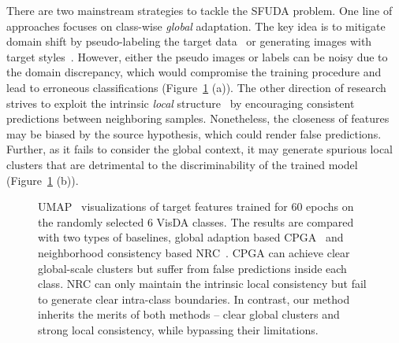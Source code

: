 \documentclass{article}
\begin{document}
There are two mainstream strategies to tackle the SFUDA problem. 
One line of approaches focuses on class-wise \textit{global} adaptation.
The key idea is to mitigate domain shift by pseudo-labeling the target data~\cite{shot, Qiu2021ijcai} or generating images with target styles~\cite{li2020model}.
However, either the pseudo images or labels can be noisy due to the domain discrepancy, which would compromise the training procedure and lead to erroneous classifications (Figure~\ref{fig:teaser} (a)).
The other direction of research strives to exploit the intrinsic \textit{local} structure~\cite{nrc_nips_2021,gsfda_iccv_2021} by encouraging consistent predictions between neighboring samples.
Nonetheless, the closeness of features may be biased by the source hypothesis, which could render false predictions.
Further, as it fails to consider the global context, it may generate spurious local clusters that are detrimental to the discriminability of the trained model (Figure~\ref{fig:teaser} (b)).




\begin{figure}[!htbp]
\centering
{}
\centering
\caption{UMAP~\cite{mcinnes2018umap-software} visualizations of target features trained for 60 epochs on the randomly selected 6 VisDA classes. The results are compared with two types of baselines, global adaption based CPGA~\cite{Qiu2021ijcai} and neighborhood consistency based NRC~\cite{nrc_nips_2021}.
CPGA can achieve clear global-scale clusters but suffer from false predictions inside each class. NRC can only maintain the intrinsic local consistency but fail to generate clear intra-class boundaries. In contrast, our method inherits the merits of both methods -- clear global clusters and strong local consistency, while bypassing their limitations.}
\label{fig:teaser}
\vspace{-3mm}
\end{figure}
\end{document}
